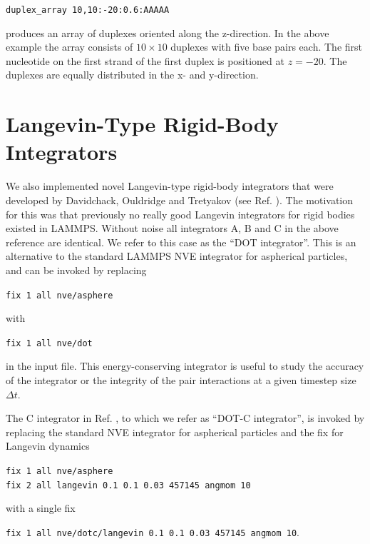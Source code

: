 \documentclass[12pt,onecolumn]{article}
\begin{document}
\smallskip
\texttt{duplex\_array 10,10:-20:0.6:AAAAA}
\smallskip

\noindent produces an array of duplexes oriented along the z-direction. 
In the above example the array consists of $10 \times 10$ duplexes with five base pairs each.
The first nucleotide on the first strand of the first duplex is positioned at $z=-20$. The duplexes
are equally distributed in the x- and y-direction.  

\section{Langevin-Type Rigid-Body Integrators}

We also implemented novel Langevin-type rigid-body integrators that were developed
by Davidchack, Ouldridge and Tretyakov (see Ref. \cite{Davidchack:2015}).
The motivation for this was that previously no really good Langevin integrators for rigid bodies
existed in LAMMPS.
Without noise all integrators A, B and C in the above reference are identical.
We refer to this case as the ``DOT integrator''. This is an alternative to the  
standard LAMMPS NVE integrator for aspherical particles, and can be invoked by replacing

\smallskip
\texttt{fix 1 all nve/asphere}\\
\smallskip

\noindent with

\smallskip
\texttt{fix 1 all nve/dot}\\
\smallskip

\noindent in the input file. This energy-conserving integrator is useful to study the accuracy of the 
integrator or the integrity of the pair interactions at a given timestep size $\Delta t$.

\noindent The C integrator in Ref. \cite{Davidchack:2015}, to which we refer as ``DOT-C integrator'',
 is invoked by replacing the standard NVE integrator 
for aspherical particles and the fix for Langevin dynamics 

\smallskip
\texttt{fix 1 all nve/asphere}\\
\texttt{fix 2 all langevin 0.1 0.1 0.03 457145 angmom 10}\\
\smallskip

\noindent with a single fix

\smallskip
\texttt{fix 1 all nve/dotc/langevin 0.1 0.1 0.03 457145 angmom 10}.\\
\smallskip
\end{document}
